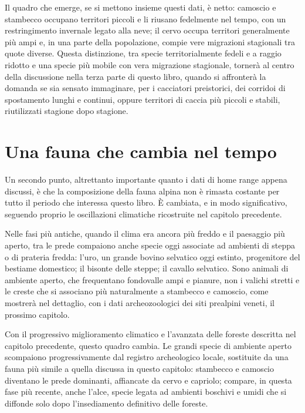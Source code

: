 Il quadro che emerge, se si mettono insieme questi dati, è netto: camoscio e stambecco occupano territori piccoli e li riusano fedelmente nel tempo, con un restringimento invernale legato alla neve; il cervo occupa territori generalmente più ampi e, in una parte della popolazione, compie vere migrazioni stagionali tra quote diverse. Questa distinzione, tra specie territorialmente fedeli e a raggio ridotto e una specie più mobile con vera migrazione stagionale, tornerà al centro della discussione nella terza parte di questo libro, quando si affronterà la domanda se sia sensato immaginare, per i cacciatori preistorici, dei corridoi di spostamento lunghi e continui, oppure territori di caccia più piccoli e stabili, riutilizzati stagione dopo stagione.

\section{Una fauna che cambia nel tempo}

Un secondo punto, altrettanto importante quanto i dati di home range appena discussi, è che la composizione della fauna alpina non è rimasta costante per tutto il periodo che interessa questo libro. È cambiata, e in modo significativo, seguendo proprio le oscillazioni climatiche ricostruite nel capitolo precedente.

Nelle fasi più antiche, quando il clima era ancora più freddo e il paesaggio più aperto, tra le prede compaiono anche specie oggi associate ad ambienti di steppa o di prateria fredda: l'uro, un grande bovino selvatico oggi estinto, progenitore del bestiame domestico; il bisonte delle steppe; il cavallo selvatico. Sono animali di ambiente aperto, che frequentano fondovalle ampi e pianure, non i valichi stretti e le creste che si associano più naturalmente a stambecco e camoscio, come mostrerà nel dettaglio, con i dati archeozoologici dei siti prealpini veneti, il prossimo capitolo.

Con il progressivo miglioramento climatico e l'avanzata delle foreste descritta nel capitolo precedente, questo quadro cambia. Le grandi specie di ambiente aperto scompaiono progressivamente dal registro archeologico locale, sostituite da una fauna più simile a quella discussa in questo capitolo: stambecco e camoscio diventano le prede dominanti, affiancate da cervo e capriolo; compare, in questa fase più recente, anche l'alce, specie legata ad ambienti boschivi e umidi che si diffonde solo dopo l'insediamento definitivo delle foreste.

